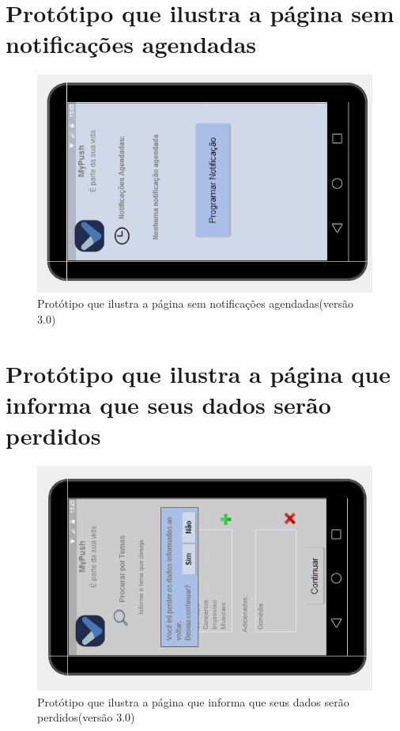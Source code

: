 \begin{apendicesenv}
      \section*{Protótipo que ilustra a página sem notificações agendadas}

    \begin{figure}[!htbp]
      \centering
      \includegraphics[scale=0.5, angle=-90]{editaveis/figuras/prototipo_alta_fidelidade_v3/3_9}
      \caption{Protótipo que ilustra a página sem notificações agendadas(versão 3.0)}
      \label{v3}
    \end{figure}
    
      \section*{Protótipo que ilustra a página que informa que seus dados serão perdidos}

    \begin{figure}[!htbp]
      \centering
      \includegraphics[scale=0.5, angle=-90]{editaveis/figuras/prototipo_alta_fidelidade_v3/3_10}
      \caption{Protótipo que ilustra a página que informa que seus dados serão perdidos(versão 3.0)}
      \label{v3}
    \end{figure}
    

\end{apendicesenv}
